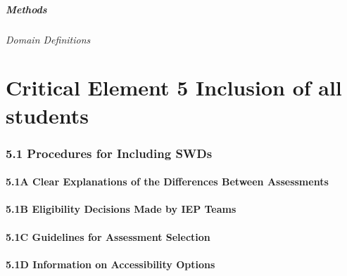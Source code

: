 \documentclass[]{book}
\let\oldparagraph\paragraph
\renewcommand{\paragraph}[1]{\oldparagraph{#1}\mbox{}}
\let\oldsubparagraph\subparagraph
\renewcommand{\subparagraph}[1]{\oldsubparagraph{#1}\mbox{}}
\begin{document}
\hypertarget{methods}{%
\paragraph{Methods}\label{methods}}

\hypertarget{domain-definitions}{%
\subparagraph{Domain Definitions}\label{domain-definitions}}

\hypertarget{critical-element-5-inclusion-of-all-students}{%
\chapter{Critical Element 5 Inclusion of all students}\label{critical-element-5-inclusion-of-all-students}}

\hypertarget{procedures-for-including-swds}{%
\subsection{5.1 Procedures for Including SWDs}\label{procedures-for-including-swds}}

\hypertarget{a-clear-explanations-of-the-differences-between-assessments}{%
\subsubsection{5.1A Clear Explanations of the Differences Between Assessments}\label{a-clear-explanations-of-the-differences-between-assessments}}

\hypertarget{b-eligibility-decisions-made-by-iep-teams}{%
\subsubsection{5.1B Eligibility Decisions Made by IEP Teams}\label{b-eligibility-decisions-made-by-iep-teams}}

\hypertarget{c-guidelines-for-assessment-selection}{%
\subsubsection{5.1C Guidelines for Assessment Selection}\label{c-guidelines-for-assessment-selection}}

\hypertarget{d-information-on-accessibility-options}{%
\subsubsection{5.1D Information on Accessibility Options}\label{d-information-on-accessibility-options}}
\end{document}

